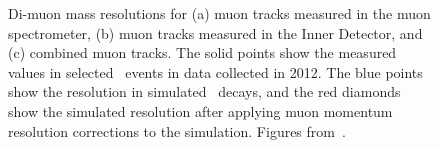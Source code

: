 \begin{figure}[h]
\centering
    \caption[Di-muon mass resolutions for muon tracks in different detector
    subsystems.]{Di-muon mass resolutions for (a) muon tracks measured in the muon
    spectrometer, (b) muon tracks measured in the Inner Detector, and (c) combined
    muon tracks. The solid points show the measured values in selected \Zmm\ events
    in data collected in 2012. The blue points show the resolution in simulated
    \Zmm\ decays, and the red diamonds show the simulated resolution after applying
    muon momentum resolution corrections to the simulation. Figures
    from~\cite{MuonPerfPlots2012}.}
\label{fig:mu-resolution-dimu}
\end{figure}

